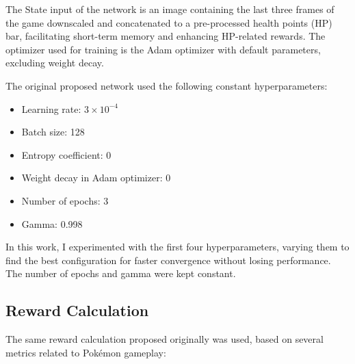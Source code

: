 \documentclass[10pt,conference]{IEEEtran}
\begin{document}
The State input of the network is an image containing the last three frames of the game downscaled and concatenated to a pre-processed health points (HP) bar, facilitating short-term memory and enhancing HP-related rewards. The optimizer used for training is the Adam optimizer with default parameters, excluding weight decay. 

The original proposed network used the following constant hyperparameters:

\begin{itemize}
  \item Learning rate: \(3 \times 10^{-4}\)
  \item Batch size: 128
  \item Entropy coefficient: 0
  \item Weight decay in Adam optimizer: 0
  \item Number of epochs: 3
  \item Gamma: 0.998
\end{itemize}

In this work, I experimented with the first four hyperparameters, varying them to find the best configuration for faster convergence without losing performance. The number of epochs and gamma were kept constant.





\subsection{Reward Calculation}

The same reward calculation proposed originally was used, based on several metrics related to Pokémon gameplay:
\end{document}
